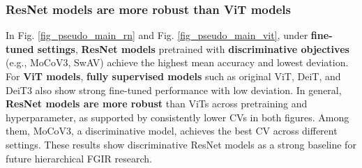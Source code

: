 \documentclass[10pt,twocolumn,letterpaper]{article}
\begin{document}
\subsubsection{ResNet models are more robust than ViT models}
In Fig. \ref{fig_pseudo_main_rn} and  Fig. \ref{fig_pseudo_main_vit}, under \textbf{fine-tuned settings}, \textbf{ResNet models} pretrained with \textbf{discriminative objectives} (e.g., MoCoV3, SwAV) achieve the highest mean accuracy and lowest deviation. For \textbf{ViT models}, \textbf{fully supervised models} such as original ViT, DeiT, and DeiT3 also show strong fine-tuned performance with low deviation. In general, \textbf{ResNet models are more robust} than ViTs across pretraining and hyperparameter, as supported by consistently lower CVs in both figures. Among them, MoCoV3, a discriminative model, achieves the best CV across different settings. These results show discriminative ResNet models as a strong baseline for future hierarchical FGIR research.



\end{document}
